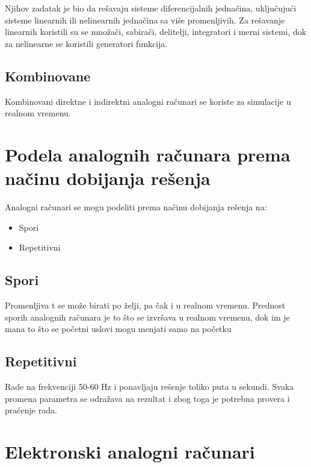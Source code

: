 \documentclass[a4paper]{article}
\begin{document}
{Njihov zadatak je bio da rešavaju sisteme diferencijalnih jednačina, uključujući sisteme linearnih ili nelinearnih jednačina sa više promenljivih. Za rešavanje linearnih koristili su se množači, sabirači, delitelji, integratori i merni sistemi, dok za nelinearne se koristili generatori funkcija.

\subsection{Kombinovane}
\label{subsec:podnaslovK}

Kombinovani direktne i indirektni analogni računari se koriste za simulacije u realnom vremenu.

\section{Podela analognih računara prema načinu dobijanja rešenja}
\label{sec:naslovcina}

Analogni računari se mogu podeliti prema načinu dobijanja rešenja na:

	\begin{itemize}
		\item Spori
		\item Repetitivni
	\end{itemize}

\subsection{Spori}
\label{subsec:podnaslovspori}

Promenljiva t se može birati po želji, pa čak i u realnom vremenu. Prednost sporih analognih računara je to što se izvršava u realnom vremenu, dok im je mana to što se početni uslovi mogu menjati samo na početku 

\subsection{Repetitivni}
\label{subsec:podnaslovrepetivni}

Rade na frekvenciji 50-60 Hz i ponavljaju rešenje toliko puta u sekundi. Svaka promena parametra se odražava na rezultat i zbog toga je potrebna provera i praćenje rada.

\newpage

\section{Elektronski analogni računari}
		\label{sec:naslov8}
		
}
\end{document}
